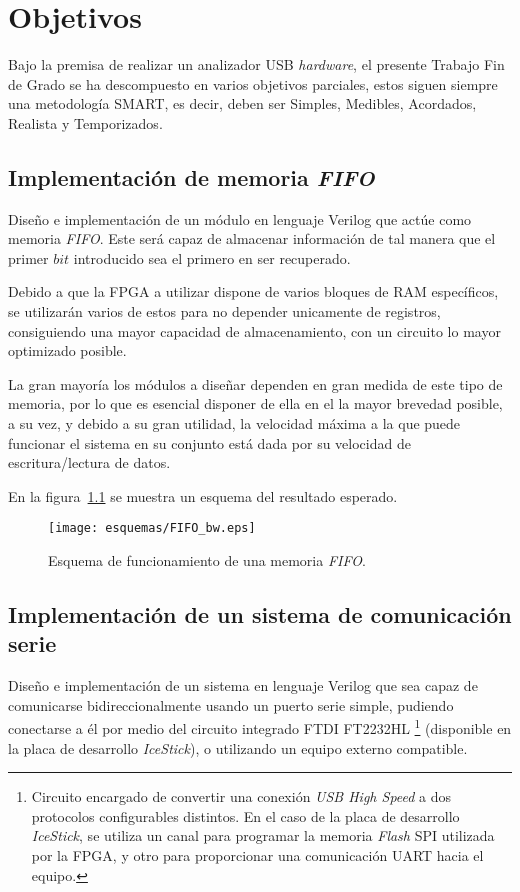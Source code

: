 \chapter{Objetivos}
\label{ch:objetivos}

Bajo la premisa de realizar un analizador USB \emph{hardware}, el presente Trabajo Fin de Grado se ha descompuesto en varios objetivos parciales, estos siguen siempre una metodología SMART, es decir, deben ser Simples, Medibles, Acordados, Realista y Temporizados.

\section{Implementación de memoria \emph{FIFO}}
Diseño e implementación de un módulo en lenguaje Verilog que actúe como memoria \emph{FIFO}. Este será capaz de almacenar información de tal manera que el primer $bit$ introducido sea el primero en ser recuperado.

Debido a que la FPGA a utilizar dispone de varios bloques de RAM específicos, se utilizarán varios de estos para no depender unicamente de registros, consiguiendo una mayor capacidad de almacenamiento, con un circuito lo mayor optimizado posible.

La gran mayoría los módulos a diseñar dependen en gran medida de este tipo de memoria, por lo que es esencial disponer de ella en el la mayor brevedad posible, a su vez, y debido a su gran utilidad, la velocidad máxima a la que puede funcionar el sistema en su conjunto está dada por su velocidad de escritura/lectura de datos.

En la figura~\ref{fig:FIFO_info} se muestra un esquema del resultado esperado.

\begin{figure}[htb]
    \centering
    \texttt{[image: esquemas/FIFO\_bw.eps]}
    \caption{Esquema de funcionamiento de una memoria \emph{FIFO}.}
    \label{fig:FIFO_info}
\end{figure}



\section{Implementación de un sistema de comunicación serie}
Diseño e implementación de un sistema en lenguaje Verilog que sea capaz de comunicarse bidireccionalmente usando un puerto serie simple\cite{design-uart-vhdl}, pudiendo conectarse a él por medio del circuito integrado FTDI FT2232HL \footnote{Circuito encargado de convertir una conexión \emph{USB High Speed} a dos protocolos configurables distintos. En el caso de la placa de desarrollo \emph{IceStick}, se utiliza un canal para programar la memoria \emph{Flash} SPI utilizada por la FPGA, y otro para proporcionar una comunicación UART hacia el equipo.} (disponible en la placa de desarrollo \emph{IceStick}\cite{icestickmanual}), o utilizando un equipo externo compatible.

